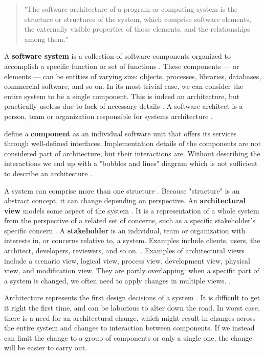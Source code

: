 \documentclass[utf8,english]{gradu3}
\begin{document}
\begin{quote}
  "The software architecture of a program or computing system is the structure or
  structures of the system, which comprise software elements, the externally
  visible properties of those elements, and the relationships among them."
\end{quote}

A \textbf{software system} is a collection of software components organized to accomplish
a specific function or set of functions \parencite[3]{IEEE42010}. These components --- or
elements --- can be entities of varying size: objects, processes, libraries,
databases, commercial software, and so on. In its most trivial case, we can
consider the entire system to be a single component. This is indeed an
architecture, but practically useless due to lack of necessary details
\parencite[24]{Bass1998}. A software architect is a person, team or organization
responsible for systems architecture \parencite[3]{IEEE42010}.

\textcite[53]{Koskimies2005} define a \textbf{component} as an individual software
unit that offers its services through well-defined interfaces. Implementation
details of the components are not considered part of architecture, but their
interactions are. Without describing the interactions we end up with a "bubbles
and lines" diagram which is not sufficient to describe an architecture
\parencite[24]{Bass1998}.

A system can comprise more than one structure \parencite[23]{Bass1998}. Because
"structure" is an abstract concept, it can change depending on perspective. An
\textbf{architectural view} models some aspect of the system \parencite{Koskimies2005}. It is a
representation of a whole system from the perspective of a related set of
concerns, such as a specific stakeholder's specific concern \parencite[3]{IEEE42010}. A
\textbf{stakeholder} is an individual, team or organization with interests in, or
concerns relative to, a system. Examples include clients, users, the architect,
developers, reviewers, and so on. \parencite[3]{IEEE42010}. Examples of architectural
views include a scenario view, logical view, process view,
development view, physical view, and modification view. They are partly
overlapping: when a specific part of a system is changed, we often need to apply
changes in multiple views. \parencite{Koskimies2005}.

Architecture represents the first design decisions of a system \parencite{Bass1998}. It is
difficult to get it right the first time, and can be laborious to alter down the
road. In worst case, there is a need for an architectural change, which might
result in changes across the entire system and changes to interaction between
components. If we instead can limit the change to a group of components or only
a single one, the change will be easier to carry out. \parencite[31]{Bass1998}
\end{document}
